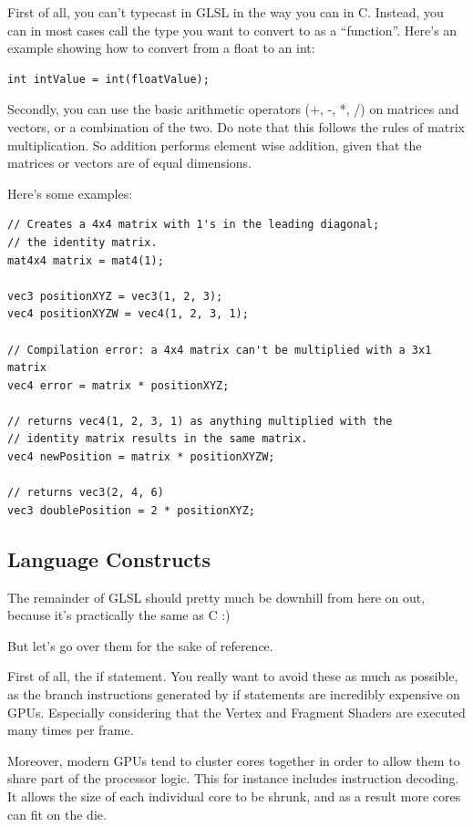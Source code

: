 First of all, you can't typecast in GLSL in the way you can in C. Instead, you can in most cases call the type you want to convert to as a ``function''. Here's an example showing how to convert from a float to an int:

\begin{verbatim}
int intValue = int(floatValue);
\end{verbatim}

Secondly, you can use the basic arithmetic operators (+, -, *, /) on matrices and vectors, or a combination of the two. Do note that this follows the rules of matrix multiplication. So addition performs element wise addition, given that the matrices or vectors are of equal dimensions.

Here's some examples:
\begin{verbatim}
// Creates a 4x4 matrix with 1's in the leading diagonal; 
// the identity matrix.
mat4x4 matrix = mat4(1); 

vec3 positionXYZ = vec3(1, 2, 3);
vec4 positionXYZW = vec4(1, 2, 3, 1);

// Compilation error: a 4x4 matrix can't be multiplied with a 3x1 matrix
vec4 error = matrix * positionXYZ; 

// returns vec4(1, 2, 3, 1) as anything multiplied with the 
// identity matrix results in the same matrix.
vec4 newPosition = matrix * positionXYZW; 

// returns vec3(2, 4, 6)
vec3 doublePosition = 2 * positionXYZ; 
\end{verbatim}


\subsection{Language Constructs}

The remainder of GLSL should pretty much be downhill from here on out, because it's practically the same as C :)

But let's go over them for the sake of reference.

First of all, the if statement. You really want to avoid these as much as possible, as the branch instructions generated by if statements are incredibly expensive on GPUs. Especially considering that the Vertex and Fragment Shaders are executed many times per frame.

Moreover, modern GPUs tend to cluster cores together in order to allow them to share part of the processor logic. This for instance includes instruction decoding. It allows the size of each individual core to be shrunk, and as a result more cores can fit on the die.

